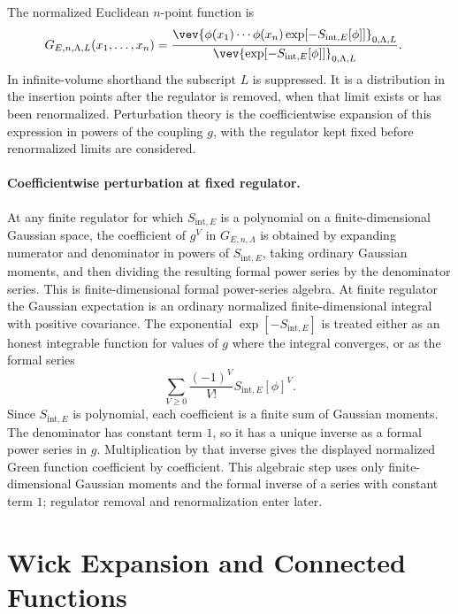 \begin{definition}
\label{def:normalized-regulated-euclidean-green-functions}
The normalized Euclidean \(n\)-point function is
\[
\begin{aligned}
  G_{E,n,\Lambda,L}(x_1,\ldots,x_n)
  &=
  \frac{\vev{
    \phi(x_1)\cdots\phi(x_n)
    \exp[-S_{\mathrm{int},E}[\phi]]
  }_{0,\Lambda,L}
  }{
  \vev{\exp[-S_{\mathrm{int},E}[\phi]]}_{0,\Lambda,L}} .
\end{aligned}
\]
In infinite-volume shorthand the subscript \(L\) is suppressed.  It is a
distribution in the insertion points after the regulator is removed, when that
limit exists or has been renormalized. Perturbation theory is the
coefficientwise expansion of this expression in powers of the coupling \(g\),
with the regulator kept fixed before renormalized limits are considered.
\end{definition}

\paragraph{Coefficientwise perturbation at fixed regulator.}
At any finite regulator for which \(S_{\mathrm{int},E}\) is a polynomial on a
finite-dimensional Gaussian space, the coefficient of \(g^V\) in
\(G_{E,n,\Lambda}\) is obtained by expanding numerator and denominator in
powers of \(S_{\mathrm{int},E}\), taking ordinary Gaussian moments, and then
dividing the resulting formal power series by the denominator series.
This is finite-dimensional formal power-series algebra.  At finite regulator
the Gaussian expectation is an ordinary normalized
finite-dimensional integral with positive covariance.  The exponential
\(\exp[-S_{\mathrm{int},E}]\) is treated either as an honest integrable
function for values of \(g\) where the integral converges, or as the formal
series
\[
  \sum_{V\ge0}
  \frac{(-1)^V}{V!}S_{\mathrm{int},E}[\phi]^V .
\]
Since \(S_{\mathrm{int},E}\) is polynomial, each coefficient is a finite sum
of Gaussian moments.  The denominator has constant term \(1\), so it has a
unique inverse as a formal power series in \(g\).  Multiplication by that
inverse gives the displayed normalized Green function coefficient by
coefficient.  This algebraic step uses only finite-dimensional Gaussian
moments and the formal inverse of a series with constant term \(1\); regulator
removal and renormalization enter later.

\section{Wick Expansion and Connected Functions}

